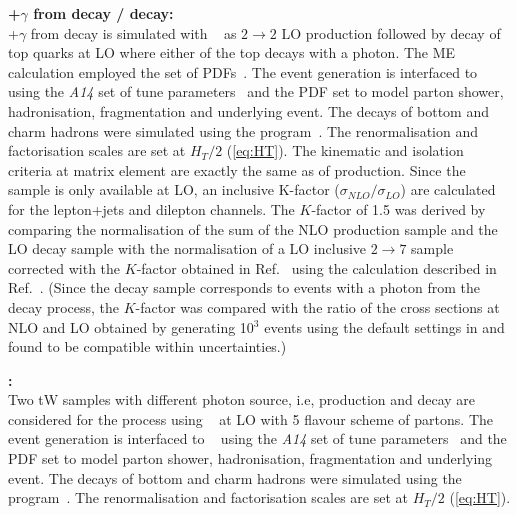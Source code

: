\textbf{\ttbar+$\gamma$ from decay / \tty decay:}\\
\ttbar+$\gamma$ from decay is simulated with \MGNLO[2.7.3]~\cite{Alwall:2014hca} as $2 \to 2$ LO \ttbar production followed by decay of top quarks at LO where either of the top decays with a photon. The ME calculation employed the \NNPDF[3.0nlo] set of PDFs~\cite{Ball:2014uwa}. The event generation is interfaced to \PYTHIA[8.240]~\cite{Sjostrand:2007gs} using the \emph{A14} set of tune parameters~\cite{ATL-PHYS-PUB-2014-021} and the \nnpdflo PDF set to model parton shower, hadronisation, fragmentation and underlying event. The decays of bottom and charm hadrons were simulated using the \EVTGEN[1.6.0] program~\cite{Lange:2001uf}. The renormalisation and factorisation scales are set at $H_{T}/2$ (\cref{eq:HT}). The kinematic and isolation criteria at matrix element are exactly the same as of \tty production. Since the sample is only available at LO, an inclusive K-factor ($\sigma_{NLO}/\sigma_{LO}$) are calculated for the lepton+jets and dilepton channels. The $K$-factor of 1.5 was derived by comparing the normalisation of the sum of the NLO \tty production sample and the LO \tty decay sample with the normalisation of a LO inclusive $2 \to 7$ \tty sample corrected with the $K$-factor obtained in Ref.~\cite{TOPQ-2017-14} using the calculation described in Ref.~\cite{Melnikov:2011ta}. (Since the \tty decay sample corresponds to \ttbar events with a photon from the decay process, the $K$-factor was compared with the ratio of the \ttbar cross sections at NLO and LO obtained by generating 10$^3$ events using the default settings in \MGNLO and found to be compatible within uncertainties.)


\textbf{\tWy:}\\
Two tW samples with different photon source, i.e, production and decay are considered for the \tWy process using \MGNLO[2.7.3]~\cite{Alwall:2014hca} at LO with 5 flavour scheme of partons. The event generation is interfaced to \PYTHIA[8.240]~\cite{Sjostrand:2007gs} using the \emph{A14} set of tune parameters~\cite{ATL-PHYS-PUB-2014-021} and the \nnpdflo PDF set to model parton shower, hadronisation, fragmentation and underlying event. The decays of bottom and charm hadrons were simulated using the \EVTGEN[1.6.0] program~\cite{Lange:2001uf}. The renormalisation and factorisation scales are set at $H_{T}/2$ (\cref{eq:HT}). %



